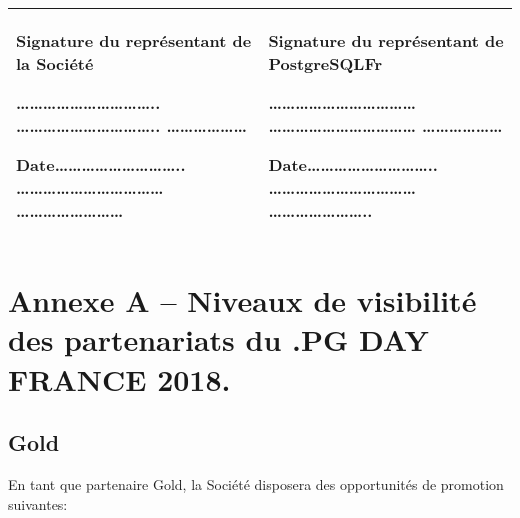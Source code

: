 \documentclass[]{article}
\begin{document}
\begin{longtable}[]{@{}ll@{}}
\toprule
\endhead
\begin{minipage}[t]{0.47\columnwidth}\raggedright
Signature du représentant de la Société

\ldots{}\ldots{}\ldots{}\ldots{}\ldots{}\ldots{}\ldots{}\ldots{}\ldots{}\ldots{}..
\ldots{}\ldots{}\ldots{}\ldots{}\ldots{}\ldots{}\ldots{}\ldots{}\ldots{}\ldots{}..
\ldots{}\ldots{}\ldots{}\ldots{}\ldots{}\ldots{}

Date\ldots{}\ldots{}\ldots{}\ldots{}\ldots{}\ldots{}\ldots{}\ldots{}\ldots{}..
\ldots{}\ldots{}\ldots{}\ldots{}\ldots{}\ldots{}\ldots{}\ldots{}\ldots{}\ldots{}\ldots{}
\ldots{}\ldots{}\ldots{}\ldots{}\ldots{}\ldots{}\ldots{}\ldots{}\strut
\end{minipage} & \begin{minipage}[t]{0.47\columnwidth}\raggedright
Signature du représentant de PostgreSQLFr

\ldots{}\ldots{}\ldots{}\ldots{}\ldots{}\ldots{}\ldots{}\ldots{}\ldots{}\ldots{}\ldots{}
\ldots{}\ldots{}\ldots{}\ldots{}\ldots{}\ldots{}\ldots{}\ldots{}\ldots{}\ldots{}\ldots{}
\ldots{}\ldots{}\ldots{}\ldots{}\ldots{}\ldots{}

Date\ldots{}\ldots{}\ldots{}\ldots{}\ldots{}\ldots{}\ldots{}\ldots{}\ldots{}..
\ldots{}\ldots{}\ldots{}\ldots{}\ldots{}\ldots{}\ldots{}\ldots{}\ldots{}\ldots{}\ldots{}
\ldots{}\ldots{}\ldots{}\ldots{}\ldots{}\ldots{}\ldots{}..\strut
\end{minipage}\tabularnewline
\bottomrule
\end{longtable}

\hypertarget{annexe-a-niveaux-de-visibilituxe9-des-partenariats-du-.pg-day-france-2018.}{%
\section{Annexe A -- Niveaux de visibilité des partenariats du .PG DAY
FRANCE
2018.}\label{annexe-a-niveaux-de-visibilituxe9-des-partenariats-du-.pg-day-france-2018.}}

\hypertarget{gold}{%
\subsection{Gold}\label{gold}}

En tant que partenaire Gold, la Société disposera des opportunités de
promotion suivantes:\\
\end{document}
